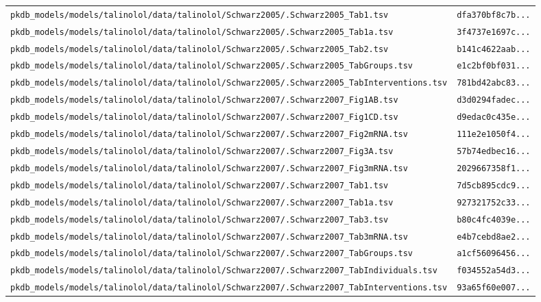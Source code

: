 \begin{longtable}{ll}
\texttt{pkdb\_models/models/talinolol/data/talinolol/Schwarz2005/.Schwarz2005\_Tab1.tsv} & \texttt{dfa370bf8c7b...} \\
\texttt{pkdb\_models/models/talinolol/data/talinolol/Schwarz2005/.Schwarz2005\_Tab1a.tsv} & \texttt{3f4737e1697c...} \\
\texttt{pkdb\_models/models/talinolol/data/talinolol/Schwarz2005/.Schwarz2005\_Tab2.tsv} & \texttt{b141c4622aab...} \\
\texttt{pkdb\_models/models/talinolol/data/talinolol/Schwarz2005/.Schwarz2005\_TabGroups.tsv} & \texttt{e1c2bf0bf031...} \\
\texttt{pkdb\_models/models/talinolol/data/talinolol/Schwarz2005/.Schwarz2005\_TabInterventions.tsv} & \texttt{781bd42abc83...} \\
\texttt{pkdb\_models/models/talinolol/data/talinolol/Schwarz2007/.Schwarz2007\_Fig1AB.tsv} & \texttt{d3d0294fadec...} \\
\texttt{pkdb\_models/models/talinolol/data/talinolol/Schwarz2007/.Schwarz2007\_Fig1CD.tsv} & \texttt{d9edac0c435e...} \\
\texttt{pkdb\_models/models/talinolol/data/talinolol/Schwarz2007/.Schwarz2007\_Fig2mRNA.tsv} & \texttt{111e2e1050f4...} \\
\texttt{pkdb\_models/models/talinolol/data/talinolol/Schwarz2007/.Schwarz2007\_Fig3A.tsv} & \texttt{57b74edbec16...} \\
\texttt{pkdb\_models/models/talinolol/data/talinolol/Schwarz2007/.Schwarz2007\_Fig3mRNA.tsv} & \texttt{2029667358f1...} \\
\texttt{pkdb\_models/models/talinolol/data/talinolol/Schwarz2007/.Schwarz2007\_Tab1.tsv} & \texttt{7d5cb895cdc9...} \\
\texttt{pkdb\_models/models/talinolol/data/talinolol/Schwarz2007/.Schwarz2007\_Tab1a.tsv} & \texttt{927321752c33...} \\
\texttt{pkdb\_models/models/talinolol/data/talinolol/Schwarz2007/.Schwarz2007\_Tab3.tsv} & \texttt{b80c4fc4039e...} \\
\texttt{pkdb\_models/models/talinolol/data/talinolol/Schwarz2007/.Schwarz2007\_Tab3mRNA.tsv} & \texttt{e4b7cebd8ae2...} \\
\texttt{pkdb\_models/models/talinolol/data/talinolol/Schwarz2007/.Schwarz2007\_TabGroups.tsv} & \texttt{a1cf56096456...} \\
\texttt{pkdb\_models/models/talinolol/data/talinolol/Schwarz2007/.Schwarz2007\_TabIndividuals.tsv} & \texttt{f034552a54d3...} \\
\texttt{pkdb\_models/models/talinolol/data/talinolol/Schwarz2007/.Schwarz2007\_TabInterventions.tsv} & \texttt{93a65f60e007...} \\

\end{longtable}
